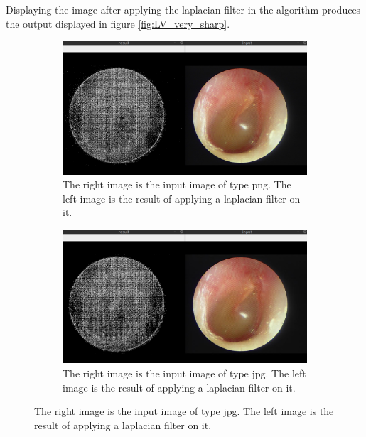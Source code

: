 Displaying the image after applying the laplacian filter in the algorithm produces the output displayed in figure \ref{fig:LV_very_sharp}.

\begin{figure}[H]
    \centering
    \begin{subfigure}[t]{0.48\textwidth}
	    \includegraphics[width=\textwidth]{Figures/lv/lv_33_png.png}
	    \caption{The right image is the input image of type png. The left image is the result of applying a laplacian filter on it.}
    \end{subfigure}\hspace{1em}
    \begin{subfigure}[t]{0.48\textwidth}
    		\includegraphics[width=\textwidth]{Figures/lv/lv_33_jpg.png}
    		\caption{The right image is the input image of type jpg. The left image is the result of applying a laplacian filter on it.}
    \end{subfigure}\hspace{1em}


\end{figure}
